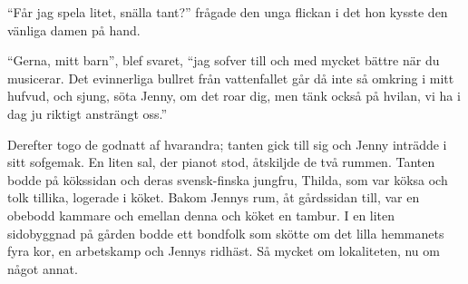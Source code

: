 ``Får jag spela litet, snälla tant?'' frågade den unga flickan i det hon
kysste den vänliga damen på hand.

``Gerna, mitt barn'', blef svaret, ``jag sofver till och med mycket
bättre när du musicerar. Det evinnerliga bullret från vattenfallet går
då inte så omkring i mitt hufvud, och sjung, söta Jenny, om det roar
dig, men tänk också på hvilan, vi ha i dag ju riktigt ansträngt oss.''

Derefter togo de godnatt af hvarandra; tanten gick till sig och Jenny
inträdde i sitt sofgemak. En liten sal, der pianot stod, åtskiljde de
två rummen. Tanten bodde på kökssidan och deras svensk-finska jungfru,
Thilda, som var köksa och tolk tillika, logerade i köket. Bakom Jennys
rum, åt gårdssidan till, var en obebodd kammare och emellan denna och
köket en tambur. I en liten sidobyggnad på gården bodde ett bondfolk som
skötte om det lilla hemmanets fyra kor, en arbetskamp och Jennys
ridhäst. Så mycket om lokaliteten, nu om något annat.

